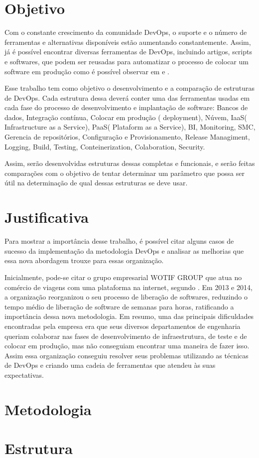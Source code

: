 \section{Objetivo}

Com o constante crescimento da comunidade DevOps, o suporte 
e o número de ferramentas e alternativas disponíveis estão 
aumentando constantemente. Assim, já é possível encontrar 
diversas ferramentas de DevOps, incluindo artigos, scripts 
e softwares, que podem ser reusadas para 
automatizar o processo de colocar um software em produção 
como é possível observar em \cite{nelson2013test} e 
\cite{sabharwal2014automation}. 

Esse trabalho tem como objetivo o desenvolvimento e a 
comparação de estruturas de DevOps. Cada estrutura dessa 
deverá conter uma das ferramentas usadas em cada fase do 
processo de desenvolvimento e implantação de software: 
Bancos de dados, Integração contínua, Colocar em produção
( deployment), Núvem, IaaS( Infrastructure as a Service),
PaaS( Plataform as a Service), BI, Monitoring, SMC, 
Gerencia de repositórios, Configuração e Provisionamento, 
Release Managiment, Logging, Build, Testing, Conteinerization, 
Colaboration, Security.

Assim, serão desenvolvidas estruturas dessas completas e 
funcionais, e serão feitas comparações com o objetivo de 
tentar determinar um parâmetro que possa ser útil na 
determinação de qual dessas estruturas se deve usar.

\section{Justificativa}

Para mostrar a importância desse trabalho, é possível citar 
alguns casos de sucesso da implementação da metodologia DevOps 
e analisar as melhorias que essa nova abordagem trouxe 
para essas organização.

Inicialmente, pode-se citar o grupo empresarial WOTIF GROUP que 
atua no comércio de viagens com uma plataforma na internet, 
segundo \cite{callanandevops}. Em 2013 e 2014, a organização 
reorganizou o seu processo de liberação de softwares, reduzindo 
o tempo médio de liberação de software de semanas para horas, 
ratificando a importância dessa nova metodologia. Em resumo, 
uma das principais dificuldades encontradas pela empresa era 
que seus diversos departamentos de engenharia queriam colaborar 
nas fases de desenvolvimento de infraestrutura, de teste e de 
colocar em produção, mas não conseguiam encontrar uma maneira 
de fazer isso. Assim essa organização conseguiu resolver seus 
problemas utilizando as técnicas de DevOps e criando uma cadeia 
de ferramentas que atendeu às suas expectativas.


\section{Metodologia}

\section{Estrutura}